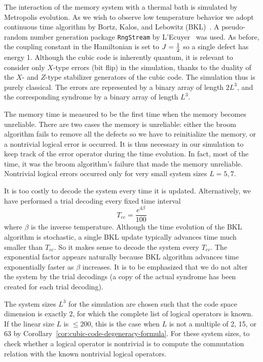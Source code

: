 The interaction of the memory system with a thermal bath is simulated by Metropolis evolution.
As we wish to observe low temperature behavior we adopt continuous time algorithm by Bortz, Kalos, and Lebowitz (BKL)~\cite{BortzKalosLebowitz1975}.
A pseudo-random number generation package \verb|RngStream| by L'Ecuyer~\cite{LEcuyerEtAl2002RngStream} was used.
As before, the coupling constant in the Hamiltonian is set to $J = \frac{1}{2}$ so a single defect has energy 1.
Although the cubic code is inherently quantum,
it is relevant to consider only $X$-type errors (bit flip) in the simulation,
thanks to the duality of the $X$- and $Z$-type stabilizer generators of the cubic code.
The simulation thus is purely classical.
The errors are represented by a binary array of length $2L^3$,
and the corresponding syndrome by a binary array of length $L^3$.

The memory time is measured to be the first time when the memory becomes unreliable.
There are two cases the memory is unreliable: 
either the broom algorithm fails to remove all the defects so we have to reinitialize the memory, 
or a nontrivial logical error is occurred. 
It is thus necessary in our simulation to keep track of the error operator during the time evolution.
In fact, most of the time, it was the broom algorithm's failure that made the memory unreliable.
Nontrivial logical errors occurred only for very small system sizes $L=5,7$.

It is too costly to decode the system every time it is updated. 
Alternatively, we have performed a trial decoding  every fixed time interval
\[
 T_{ec} = \frac{e^{4\beta}}{100}
\]
where $\beta$ is the inverse temperature.
Although the time evolution of the BKL algorithm is stochastic, 
a single BKL update typically advances time much smaller than $T_{ec}$. 
So it makes sense to decode the system every $T_{ec}$. 
The exponential factor appears naturally 
because BKL algorithm advances time exponentially faster as $\beta$ increases. 
It is to be emphasized that we do not alter the system by the
trial decodings (a copy of the actual syndrome has been created for each trial decoding). 

The system sizes $L^3$ for the simulation 
are chosen such that the code space dimension is exactly $2$,
for which the complete list of logical operators is known.
If the linear size $L$ is $\le 200$, 
this is the case when $L$ is not a multiple of 2, 15, or 63 by Corollary~\ref{cor:cubic-code-degeneracy-formula}.
For these system sizes, 
to check whether a logical operator is nontrivial 
is to compute the commutation relation with the known nontrivial logical operators.

